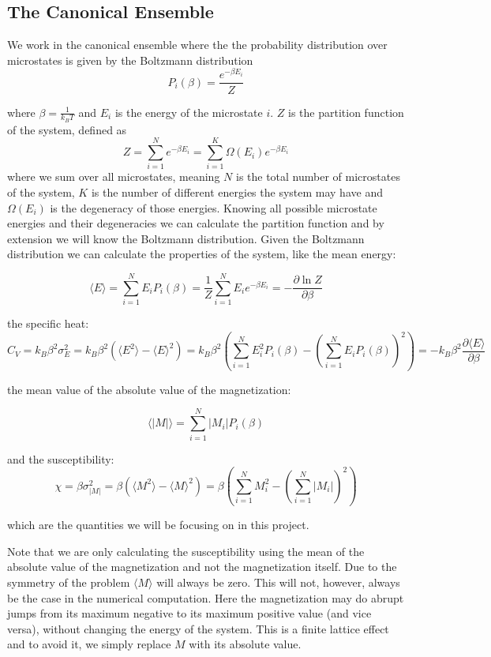 \documentclass[english, 12pt]{article}
\newcommand{\f}{\frac}
\begin{document}
\subsection{The Canonical Ensemble}
We work in the canonical ensemble where the the probability distribution over microstates is given by the Boltzmann distribution
$$P_i(\beta) = \f{e^{-\beta E_i}}{Z}$$

where $\beta = \f{1}{k_BT}$ and $E_i$ is the energy of the microstate $i$. $Z$ is the partition function of the system, defined as
$$Z = \sum\limits_{i=1}^Ne^{-\beta E_i} = \sum\limits_{i=1}^K\Omega(E_i)e^{-\beta E_i}$$
where we sum over all microstates, meaning $N$ is the total number of microstates of the system, $K$ is the number of different energies the system may have and $\Omega(E_i)$ is the degeneracy of those energies. Knowing all possible microstate energies and their degeneracies we can calculate the partition function and by extension we will know the Boltzmann distribution. Given the Boltzmann distribution we can calculate the properties of the system, like the mean energy:

$$\langle E\rangle = \sum\limits_{i=1}^NE_iP_i(\beta) = \f{1}{Z}\sum\limits_{i=1}^NE_ie^{-\beta E_i} = -\f{\partial \ln Z}{\partial \beta}$$


the specific heat:
$$C_V = k_B\beta^2\sigma_E^2 = k_B\beta^2(\langle E^2\rangle-\langle E\rangle^2) =  k_B\beta^2\left(\sum\limits_{i=1}^NE_i^2P_i(\beta) - \left(\sum\limits_{i=1}^NE_iP_i(\beta)\right)^2\right) = -k_B\beta^2\f{\partial \langle E\rangle}{\partial \beta}$$

the  mean value of the absolute value of the magnetization:

$$\langle |M|\rangle = \sum\limits_{i=1}^N|M_i|P_i(\beta)$$

and the susceptibility:
$$\chi = \beta\sigma_{|M|}^2 =\beta(\langle M^2\rangle - \langle M\rangle^2) =  \beta\left(\sum\limits_{i=1}^NM_i^2 - \left(\sum\limits_{i=1}^N|M_i|\right)^2\right)$$

which are the quantities we will be focusing on in this project.

Note that we are only calculating the susceptibility using the mean of the absolute value of the magnetization and not the magnetization itself. Due to the symmetry of the problem $\langle M\rangle$ will always be zero. This will not, however, always be the case in the numerical computation. Here the magnetization may do abrupt jumps from its maximum negative to its maximum positive value (and vice versa), without changing the energy of the system. This is a finite lattice effect and to avoid it, we simply replace $M$ with its absolute value.
\end{document}
